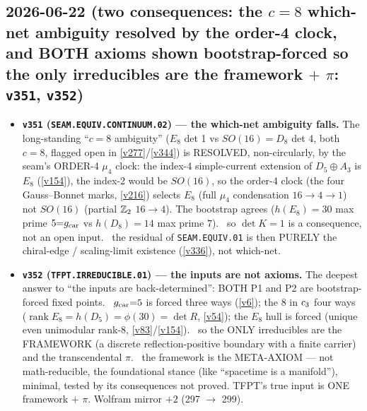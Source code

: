 \subsection*{2026-06-22 (two consequences: the $c{=}8$ which-net ambiguity resolved by the order-4 clock, and BOTH axioms shown bootstrap-forced so the only irreducibles are the framework $+$ $\pi$: \texttt{v351}, \texttt{v352})}
\begin{itemize}
\item \textbf{\texttt{v351} (\texttt{SEAM.EQUIV.CONTINUUM.02}) --- the which-net ambiguity falls.} The
long-standing ``$c{=}8$ ambiguity'' ($E_8$ det 1 vs $SO(16){=}D_8$ det 4, both $c{=}8$, flagged open in
\vref{v277}/\vref{v344}) is RESOLVED, non-circularly, by the seam's ORDER-4 $\mu_4$ clock: the index-4 simple-current
extension of $D_5\!\oplus\!A_3$ is $E_8$ (\vref{v154}), the index-2 would be $SO(16)$, so the order-4 clock (the
four Gauss--Bonnet marks, \vref{v216}) selects $E_8$ (full $\mu_4$ condensation $16{\to}4{\to}1$) not $SO(16)$
(partial $\mathbb{Z}_2$ $16{\to}4$). The bootstrap agrees ($h(E_8){=}30$ max prime $5{=}g_{\mathrm{car}}$ vs $h(D_8){=}14$ max prime
$7$). \mE\ so $\det K{=}1$ is a consequence, not an open input. \mO\ the residual of \texttt{SEAM.EQUIV.01} is then
PURELY the chiral-edge / scaling-limit existence (\vref{v336}), not which-net.
\item \textbf{\texttt{v352} (\texttt{TFPT.IRREDUCIBLE.01}) --- the inputs are not axioms.} The deepest answer to
``the inputs are back-determined'': BOTH P1 and P2 are bootstrap-forced fixed points. \mE\ $g_{\mathrm{car}}{=}5$ is forced
three ways (\vref{v6}); the $8$ in $c_3$ four ways ($\operatorname{rank}E_8=h(D_5)=\phi(30)=\det R$, \vref{v54});
the $E_8$ hull is forced (unique even unimodular rank-8, \vref{v83}/\vref{v154}). \mE\ so the ONLY irreducibles are
the FRAMEWORK (a discrete reflection-positive boundary with a finite carrier) and the transcendental $\pi$. \mO\ the
framework is the META-AXIOM --- not math-reducible, the foundational stance (like ``spacetime is a manifold''),
minimal, tested by its consequences not proved. TFPT's true input is ONE framework $+$ $\pi$. Wolfram mirror $+2$
(297 $\to$ 299).
\end{itemize}

